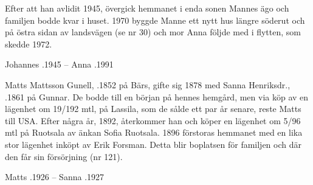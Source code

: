 Efter att han avlidit 1945, övergick hemmanet i enda sonen Mannes ägo och familjen bodde kvar i huset. 1970 byggde Manne ett nytt hus längre söderut och på östra sidan av landsvägen (se nr 30) och mor Anna följde med i flytten, som skedde 1972.
\begin{jhchildren}
  \item {}
  \item {}
  \item {}
  \item {}
  \item {}
  \item {}
  \item {}
\end{jhchildren}
Johannes .1945  --  Anna .1991


Matts Mattsson Gunell, .1852 på Bärs, gifte sig 1878 med Sanna Henriksdr., .1861 på Gunnar. De bodde till en början på hennes hemgård, men via köp av en lägenhet om 19/192 mtl, på  Lassila, som de sålde ett par år senare, reste Matts till USA. Efter några år, 1892, återkommer han och köper en lägenhet om 5/96 mtl på Ruotsala av änkan Sofia Ruotsala. 1896 förstoras hemmanet med en lika stor lägenhet inköpt av Erik Forsman. Detta blir boplatsen för familjen och där den får sin försörjning (nr 121).
\begin{jhchildren}
  \item {}
  \item {}
  \item {}
  \item {}
  \item {}
  \item {}
  \item {}
  \item {}
  \item {}
  \item {}
\end{jhchildren}
Matts .1926  --  Sanna .1927

